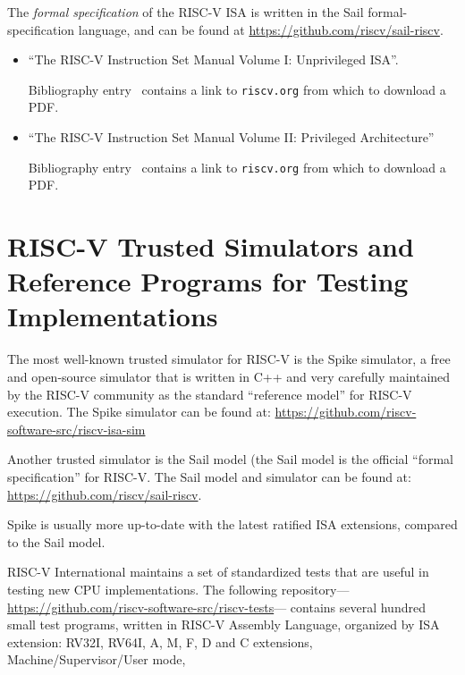 The \emph{formal specification} of the RISC-V ISA is written in the
Sail formal-specification language, and can be found at
\url{https://github.com/riscv/sail-riscv}.

\begin{itemize}

\item ``The RISC-V Instruction Set Manual Volume I: Unprivileged ISA''.  

  Bibliography entry~\cite{RISCV_Unpriv_2019_12_13} contains a link
  to {\tt riscv.org} from which to download a PDF.

\item ``The RISC-V Instruction Set Manual Volume II: Privileged Architecture''

  Bibliography entry~\cite{RISCV_Priv_2021_12_03} contains a link
  to {\tt riscv.org} from which to download a PDF.

\end{itemize}


\section{RISC-V Trusted Simulators and Reference Programs for Testing Implementations}

\label{apx_resources_trusted_simulators}

The most well-known trusted simulator for RISC-V is the Spike
simulator, a free and open-source simulator that is written in C++ and
very carefully maintained by the RISC-V community as the standard
``reference model'' for RISC-V execution. The Spike simulator can be
found at: \url{https://github.com/riscv-software-src/riscv-isa-sim}

Another trusted simulator is the Sail model (the Sail model is the
official ``formal specification'' for RISC-V.  The Sail model and
simulator can be found at: \url{https://github.com/riscv/sail-riscv}.

Spike is usually more up-to-date with the latest ratified ISA
extensions, compared to the Sail model.

RISC-V International maintains a set of standardized tests that are
useful in testing new CPU implementations.  The following
repository---
\url{https://github.com/riscv-software-src/riscv-tests}--- contains
several hundred small test programs, written in RISC-V Assembly
Language, organized by ISA extension: RV32I, RV64I, A, M, F, D and C
extensions, Machine/Supervisor/User mode, {\etc}

